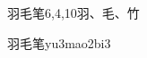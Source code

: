 \begin{entry}{羽毛笔}{6,4,10}{⽻、⽑、⽵}
  \begin{phonetics}{羽毛笔}{yu3mao2bi3}
  \end{phonetics}
\end{entry}
